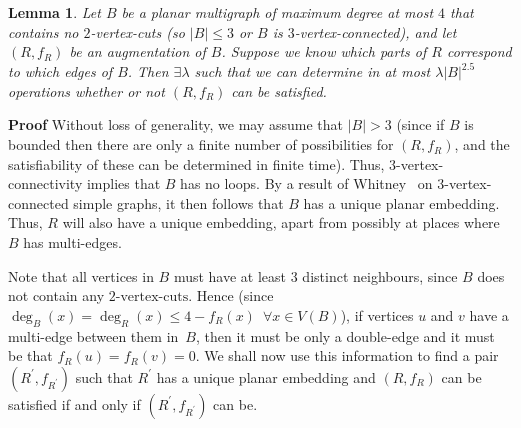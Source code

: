 \documentclass{article}
\newtheorem{Lemma}[Theorem]{Lemma}
\newtheorem{Proof of Theorem}{Proof of Theorem}
\begin{document}
\begin{Lemma} \label{lemma2}
Let $B$ be a planar multigraph of maximum degree at most $4$ that contains no $2$-vertex-cuts
(so $|B| \leq 3$ or $B$ is $3$-vertex-connected),
and let $(R,f_{R})$ be an augmentation of $B$.
Suppose we know which parts of $R$ correspond to which edges of $B$.
Then $\exists \lambda$ such that we can determine in at most $\lambda|B|^{2.5}$ operations
whether or not $(R,f_{R})$ can be satisfied.
\end{Lemma}
\textbf{Proof}
Without loss of generality,
we may assume that $|B|>3$
(since if $B$ is bounded then there are only a finite number of possibilities for $(R,f_{R})$,
and the satisfiability of these can be determined in finite time).
Thus, $3$-vertex-connectivity implies that $B$ has no loops.
By a result of Whitney~\cite{whi} on $3$-vertex-connected simple graphs,
it then follows that $B$ has a unique planar embedding.
Thus, $R$ will also have a unique embedding,
apart from possibly at places where $B$ has multi-edges.

Note that all vertices in $B$ must have at least $3$ distinct neighbours,
since $B$ does not contain any $2\textrm{-vertex-cuts}$.
Hence (since $\deg_{B}(x) = \deg_{R}(x) \leq 4 -f_{R}(x)$~$\forall x \in V(B)$),
if vertices $u$ and $v$ have a multi-edge between them in~$B$,
then it must be only a double-edge
and it must be that $f_{R}(u) = f_{R}(v) = 0$.
We shall now use this information to find a pair $(R^{\prime},f_{R^{\prime}})$
such that $R^{\prime}$ has a unique planar embedding and
$(R,f_{R})$ can be satisfied if and only if
$(R^{\prime},f_{R^{\prime}})$ can be.
\end{document}
